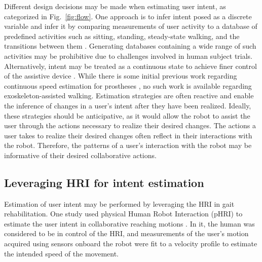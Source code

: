 Different design decisions may be made when estimating user intent, as categorized in Fig.~\ref{fig:flow}. One approach is to infer intent posed as a discrete variable and infer it by comparing measurements of user activity to a database of predefined activities such as sitting, standing, steady-state walking, and the transitions between them \cite{shen2013motion}. Generating databases containing a wide range of such activities may be prohibitive due to challenges involved in human subject trials. Alternatively, intent may be treated as a continuous state to achieve finer control of the assistive device \cite{gambon2019characterizing, suzuki2007intention}. While there is some initial previous work regarding continuous speed estimation for prostheses \cite{best2021phase}, no such work is available regarding exoskeleton-assisted walking. Estimation strategies are often reactive and enable the inference of changes in a user's intent after they have been realized. Ideally, these strategies should be anticipative, as it would allow the robot to assist the user through the actions necessary to realize their desired changes. The actions a user takes to realize their desired changes often reflect in their interactions with the robot. Therefore, the patterns of a user's interaction with the robot may be informative of their desired collaborative actions.

\subsection{Leveraging HRI for intent estimation}\label{sec:HRI}

Estimation of user intent may be performed by leveraging the HRI in gait rehabilitation. One study used physical Human Robot Interaction (pHRI) to estimate the user intent in collaborative reaching motions  \cite{corteville2007human}. In it, the human was considered to be in control of the HRI, and measurements of the user's motion acquired using sensors onboard the robot were fit to a velocity profile to estimate the intended speed of the movement. 

